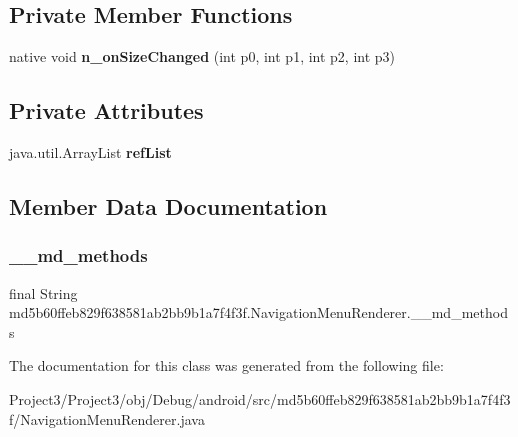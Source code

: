 \subsection*{Private Member Functions}
\begin{DoxyCompactItemize}
\item 
\mbox{\label{classmd5b60ffeb829f638581ab2bb9b1a7f4f3f_1_1NavigationMenuRenderer_acb580f3aa63c0893ea67733b7dd1de9a}} 
native void {\bfseries n\+\_\+on\+Size\+Changed} (int p0, int p1, int p2, int p3)
\end{DoxyCompactItemize}
\subsection*{Private Attributes}
\begin{DoxyCompactItemize}
\item 
\mbox{\label{classmd5b60ffeb829f638581ab2bb9b1a7f4f3f_1_1NavigationMenuRenderer_a717e3e89de8a97cac2daee362f553abe}} 
java.\+util.\+Array\+List {\bfseries ref\+List}
\end{DoxyCompactItemize}


\subsection{Member Data Documentation}
\mbox{\label{classmd5b60ffeb829f638581ab2bb9b1a7f4f3f_1_1NavigationMenuRenderer_a0f4bfebe2cdfd607a2a7599e832cfbdc}} 
\subsubsection{\texorpdfstring{\+\_\+\+\_\+md\+\_\+methods}{\_\_md\_methods}}
{\footnotesize\ttfamily final String md5b60ffeb829f638581ab2bb9b1a7f4f3f.\+Navigation\+Menu\+Renderer.\+\_\+\+\_\+md\+\_\+methods\hspace{0.3cm}{\ttfamily [static]}}



The documentation for this class was generated from the following file\+:\begin{DoxyCompactItemize}
\item 
Project3/\+Project3/obj/\+Debug/android/src/md5b60ffeb829f638581ab2bb9b1a7f4f3f/Navigation\+Menu\+Renderer.\+java\end{DoxyCompactItemize}
